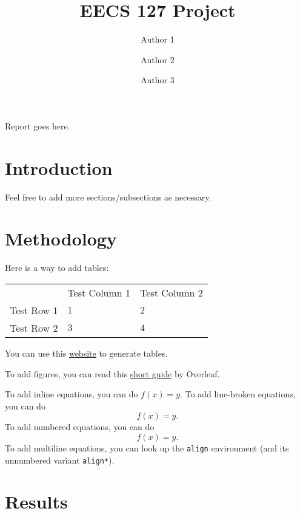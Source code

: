 \documentclass{amsart}
\title{EECS 127 Project}  %
\author{Author 1}
\author{Author 2}  %
\author{Author 3}  %
\begin{document}
\maketitle


Report goes here.

\section{Introduction}

Feel free to add more sections/subsections as necessary.

\section{Methodology}

Here is a way to add tables:
\begin{table}[H]
    \centering
    \begin{tabular}{lll}
               & Test Column 1 & Test Column 2 \\
    Test Row 1 & $1$           & $2$           \\
    Test Row 2 & $3$           & $4$          
    \end{tabular}
\end{table}
You can use this \href{https://www.tablesgenerator.com/}{website} to generate tables.

To add figures, you can read this \href{https://www.overleaf.com/learn/latex/Inserting_Images}{short guide} by Overleaf.

To add inline equations, you can do $f(x) = y$. To add line-broken equations, you can do
\[f(x) = y.\]
To add numbered equations, you can do
\begin{equation}
    f(x) = y.
\end{equation}
To add multiline equations, you can look up the \texttt{align} environment (and its unnumbered variant \texttt{align*}).

\section{Results}

\printbibliography
\end{document}
